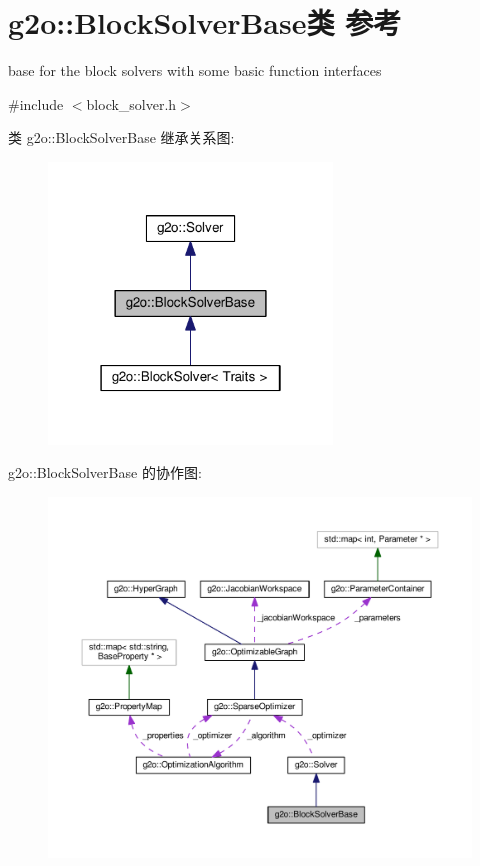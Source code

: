 \hypertarget{classg2o_1_1BlockSolverBase}{\section{g2o\-:\-:Block\-Solver\-Base类 参考}
\label{classg2o_1_1BlockSolverBase}
}


base for the block solvers with some basic function interfaces  




{\ttfamily \#include $<$block\-\_\-solver.\-h$>$}



类 g2o\-:\-:Block\-Solver\-Base 继承关系图\-:
\nopagebreak
\begin{figure}[H]
\begin{center}
\leavevmode
\includegraphics[width=214pt]{classg2o_1_1BlockSolverBase__inherit__graph}
\end{center}
\end{figure}


g2o\-:\-:Block\-Solver\-Base 的协作图\-:
\nopagebreak
\begin{figure}[H]
\begin{center}
\leavevmode
\includegraphics[width=350pt]{classg2o_1_1BlockSolverBase__coll__graph}
\end{center}
\end{figure}
